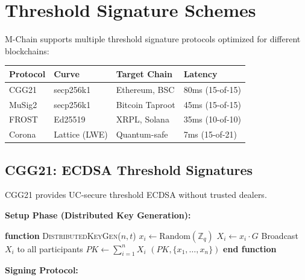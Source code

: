 \section{Threshold Signature Schemes}


M-Chain supports multiple threshold signature protocols optimized for different blockchains:

\begin{table}[h]
\centering
\begin{tabular}{@{}llll@{}}
\toprule
\textbf{Protocol} & \textbf{Curve} & \textbf{Target Chain} & \textbf{Latency} \\
\midrule
CGG21 & secp256k1 & Ethereum, BSC & 80ms (15-of-15) \\
MuSig2 & secp256k1 & Bitcoin Taproot & 45ms (15-of-15) \\
FROST & Ed25519 & XRPL, Solana & 35ms (10-of-10) \\
Corona & Lattice (LWE) & Quantum-safe & 7ms (15-of-21) \\
\bottomrule
\end{tabular}

\label{tab:threshold-schemes}
\end{table}

\subsection{CGG21: ECDSA Threshold Signatures}

CGG21 \cite{cgg21} provides UC-secure threshold ECDSA without trusted dealers.

\textbf{Setup Phase (Distributed Key Generation):}


\begin{algorithmic}[1]
\State \textbf{function} \textsc{DistributedKeyGen}($n, t$)
        \State $x_i \gets \text{Random}(\mathbb{Z}_q)$ 
        \State $X_i \gets x_i \cdot G$ 
        \State Broadcast $X_i$ to all participants
    \EndFor
    \State $PK \gets \sum_{i=1}^{n} X_i$ 
    \State \Return $(PK, \{x_1, \ldots, x_n\})$
\State \textbf{end function}
\end{algorithmic}


\textbf{Signing Protocol:}


